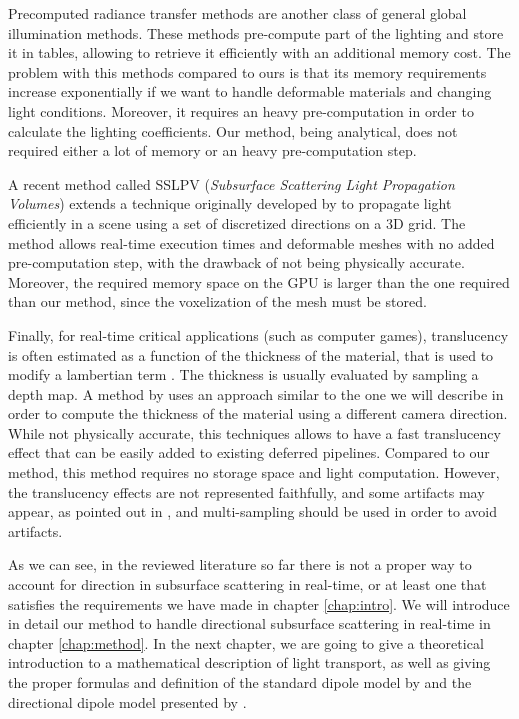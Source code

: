 Precomputed radiance transfer methods are another class of general global illumination methods. These methods pre-compute part of the lighting and store it in tables\citep{Donner:2009:EBM:1531326.1531336}, allowing to retrieve it efficiently with an additional memory cost. The problem with this methods compared to ours is that its memory requirements increase exponentially if we want to handle deformable materials and changing light conditions. Moreover, it requires an heavy pre-computation in order to calculate the lighting coefficients. Our method, being analytical, does not required either a lot of memory or an heavy pre-computation step. 

A recent method called SSLPV (\emph{Subsurface Scattering Light Propagation Volumes}) \citep{Borlum:2011:SSL:2018323.2018325} extends a technique originally developed by \cite{Kaplanyan:2010:CLP:1730804.1730821} to propagate light efficiently in a scene using a set of discretized directions on a 3D grid. The method allows real-time execution times and deformable meshes with no added pre-computation step, with the drawback of not being physically accurate. Moreover, the required memory space on the GPU is larger than the one required than our method, since the voxelization of the mesh must be stored. 

Finally, for real-time critical applications (such as computer games), translucency is often estimated as a function of the thickness of the material, that is used to modify a lambertian term \citep{Tomaszewska2012,greenrtss}. The thickness is usually evaluated by sampling a depth map. A method by \cite{Kosaka:2012:RAR:2407156.2407206} uses an approach similar to the one we will describe in order to compute the thickness of the material using a different camera direction. While not physically accurate, this techniques allows to have a fast translucency effect that can be easily added to existing deferred pipelines. Compared to our method, this method requires no storage space and light computation. However, the translucency effects are not represented faithfully, and some artifacts may appear, as pointed out in \cite{greenrtss}, and multi-sampling should be used in order to avoid artifacts. 

As we can see, in the reviewed literature so far there is not a proper way to account for direction in subsurface scattering in real-time, or at least one that satisfies the requirements we have made in chapter \ref{chap:intro}. We will introduce in detail our method to handle directional subsurface scattering in real-time in chapter \ref{chap:method}. In the next chapter, we are going to give a theoretical introduction to a mathematical description of light transport, as well as giving the proper formulas and definition of the standard dipole model by \cite{Jensen:2001:PMS:383259.383319} and the directional dipole model presented by \cite{IMM2013-06646}. 
